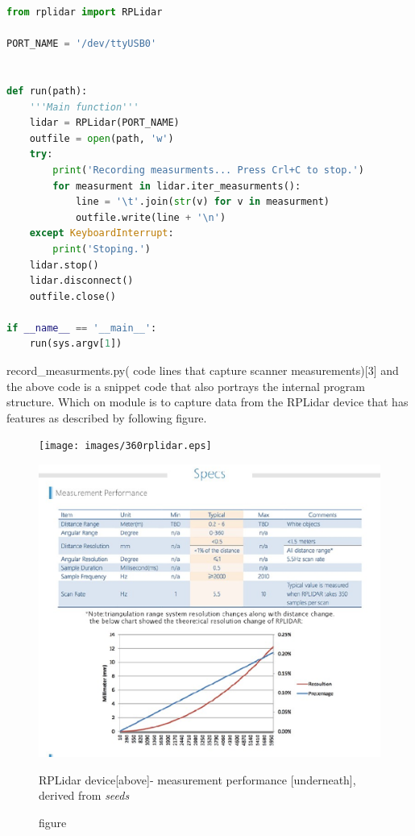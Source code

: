  \begin{center}		
\begin{lstlisting}[language=Python] 
from rplidar import RPLidar

PORT_NAME = '/dev/ttyUSB0'


def run(path):
    '''Main function'''
    lidar = RPLidar(PORT_NAME)
    outfile = open(path, 'w')
    try:
        print('Recording measurments... Press Crl+C to stop.')
        for measurment in lidar.iter_measurments():
            line = '\t'.join(str(v) for v in measurment)
            outfile.write(line + '\n')
    except KeyboardInterrupt:
        print('Stoping.')
    lidar.stop()
    lidar.disconnect()
    outfile.close()

if __name__ == '__main__':
    run(sys.argv[1])
\end{lstlisting} 
\end{center}
record\_measurments.py( code lines that capture scanner measurements)[3]
and the above code is a snippet code that also portrays  the internal program structure. Which on module is to capture data from the RPLidar device that has features as described by following figure. 
		\begin{figure}[ht]
		\centering \texttt{[image: images/360rplidar.eps]}
		
    	 \centering \includegraphics[scale=.5]{images/specifications.eps}
    	\caption{figure}{RPLidar device[above]- measurement performance [underneath], derived from \textit{seeds}} 
    	\end{figure}
\pagebreak
      
